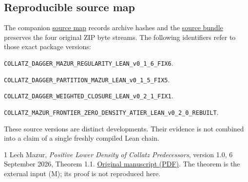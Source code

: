 \documentclass[11pt,a4paper]{article}
\theoremstyle{definition}
\begin{document}
\subsection*{Reproducible source map}
The companion
\href{https://github.com/randogelist/Collatz-Final/blob/main/docs/preprint/mazur-sources.md}{source map}
records archive hashes and the
\href{https://github.com/randogelist/Collatz-Final/blob/main/docs/preprint/mazur-source-archives.zip}{source bundle}
preserves the four original ZIP byte streams. The following identifiers
refer to those exact package versions:
{\footnotesize
\begin{description}[leftmargin=2.8em,style=nextline]
\item[{[R]}] \nolinkurl{COLLATZ_DAGGER_MAZUR_REGULARITY_LEAN_v0_1_6_FIX6}.
\item[{[P]}] \nolinkurl{COLLATZ_DAGGER_PARTITION_MAZUR_LEAN_v0_1_5_FIX5}.
\item[{[W]}] \nolinkurl{COLLATZ_DAGGER_WEIGHTED_CLOSURE_LEAN_v0_2_1_FIX1}.
\item[{[Z]}] \nolinkurl{COLLATZ_MAZUR_FRONTIER_ZERO_DENSITY_ATIER_LEAN_v0_2_0_REBUILT}.
\end{description}
}
These source versions are distinct developments. Their evidence is not
combined into a claim of a single freshly compiled Lean chain.

\begingroup
\renewcommand{\refname}{Reference}
\begin{thebibliography}{1}\small
{}
Lech Mazur, \emph{Positive Lower Density of Collatz Predecessors},
version 1.0, 6 September 2026, Theorem 1.1.
\href{https://www.proofatlas.ai/papers/positive-lower-density-collatz-predecessors/paper-v1.pdf}{Original manuscript (PDF)}.
The theorem is the external input (M); its proof is not reproduced here.
\end{thebibliography}
\endgroup
\end{document}
